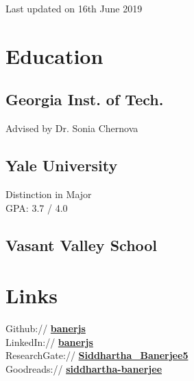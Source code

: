 \documentclass[]{deedy-resume}
\begin{document}
%
%
{\par\hfill{\scriptsize\color{gray}Last updated on 16th June 2019}}

%
%

%
%

\begin{minipage}[t]{0.33\textwidth}


\section{Education}

\subsection{Georgia Inst. of Tech.}
Advised by Dr. Sonia Chernova
\sectionsep

\subsection{Yale University}
Distinction in Major \\
GPA: 3.7 / 4.0
\sectionsep

\subsection{Vasant Valley School}


\section{Links}
Github:// \href{https://github.com/banerjs}{\bf banerjs} \\
LinkedIn://  \href{https://www.linkedin.com/in/banerjs}{\bf banerjs} \\
ResearchGate://  \href{https://www.researchgate.net/profile/Siddhartha\_Banerjee5}{\bf Siddhartha\_Banerjee5} \\
Goodreads:// \href{https://www.goodreads.com/user/show/41408373-siddhartha-banerjee}{\bf siddhartha-banerjee}


\end{minipage}
\end{document}
